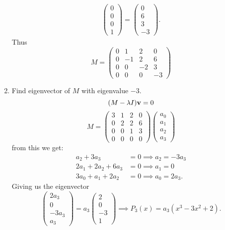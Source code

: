 \documentclass[10pt, a4paper]{article}
\begin{document}
\begin{problem}[Resit $2022$]
\begin{solution}
\begin{enumerate}[label = (\alph*)]
\begin{align*}
\begin{pmatrix}
                    0 \\ 0 \\ 0 \\ 1
                \end{pmatrix} = \begin{pmatrix}
                    0 \\ 6 \\ 3 \\ -3
                \end{pmatrix}.
            \end{align*}
            Thus
            \[
            M = \begin{pmatrix}
                0 & 1 & 2 & 0 \\
                0 & -1 & 2 & 6 \\
                0 & 0 & -2 & 3 \\
                0 & 0 & 0 & -3
            \end{pmatrix}
            \]

            \item Find eigenvector of $M$ with eigenvalue $-3$.
            \[
            (M - \lambda I)\mathbf{v} = 0
            \]
            \[
            M = \begin{pmatrix}
                3 & 1 & 2 & 0 \\
                0 & 2 & 2 & 6 \\
                0 & 0 & 1 & 3 \\
                0 & 0 & 0 & 0
            \end{pmatrix}\begin{pmatrix}
                a_0 \\ a_1 \\ a_2 \\ a_3
            \end{pmatrix}
            \]
            from this we get:
            \begin{align*}
                a_2 + 3a_3 &= 0 \implies a_2 = -3a_3 \\
                2a_1 + 2a_2 + 6a_3 &= 0 \implies a_1 = 0 \\
                3a_0 + a_1 + 2a_2 &= 0 \implies a_0 = 2a_3.
            \end{align*}
            Giving us the eigenvector
            \[
            \begin{pmatrix}
                2a_3 \\ 0 \\ -3a_3 \\ a_3
            \end{pmatrix} = a_3\begin{pmatrix}
                2 \\ 0 \\ -3 \\ 1
            \end{pmatrix} \implies P_3(x) = a_3(x ^ 3 - 3x ^ 2 + 2).
            \]
        \end{enumerate}
    \end{solution}
\end{problem}
\end{document}
